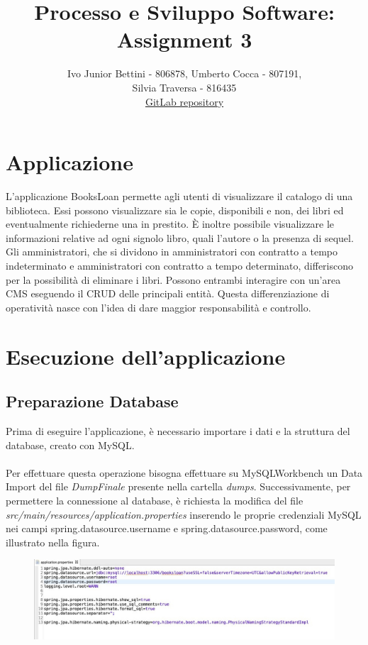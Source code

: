 \documentclass[a4paper,10pt]{article}
\title{Processo e Sviluppo Software: Assignment 3}
\author{Ivo Junior Bettini - 806878, Umberto Cocca - 807191, \\Silvia Traversa - 816435\\
\href{https://gitlab.com/s.traversa/2019_assignment3_booksloan}{GitLab repository}}
\date{}
\begin{document}
\maketitle 

\section*{Applicazione}
L'applicazione BooksLoan permette agli utenti di visualizzare il catalogo di una biblioteca. Essi possono visualizzare sia le copie, disponibili e non, dei libri ed eventualmente richiederne una in prestito. È inoltre possibile visualizzare le informazioni relative ad ogni signolo libro, quali l'autore o la presenza di sequel.\\ 

\noindent Gli amministratori, che si dividono in amministratori con contratto a tempo indeterminato e amministratori con contratto a tempo determinato, differiscono per la possibilità di eliminare i libri. Possono entrambi interagire con un'area CMS eseguendo il CRUD delle principali entità. Questa differenziazione di operatività nasce con l'idea di dare maggior responsabilità e controllo.

\section*{Esecuzione dell'applicazione}
\subsection*{Preparazione Database}
Prima di eseguire l'applicazione, è necessario importare i dati e la struttura del database, creato con MySQL.\\\\
Per effettuare questa operazione bisogna effettuare su MySQLWorkbench un Data Import del file \textit{DumpFinale} presente nella cartella \textit{dumps}. Successivamente, per permettere la connessione al database, è richiesta la modifica del file \textit{src/main/resources/application.properties} inserendo le proprie credenziali MySQL nei campi spring.datasource.username e spring.datasource.password, come illustrato nella figura.\\
\begin{figure}[H]
	\centering
	\includegraphics[width=1\linewidth]{images/properties}
\end{figure}
\newpage
\end{document}
